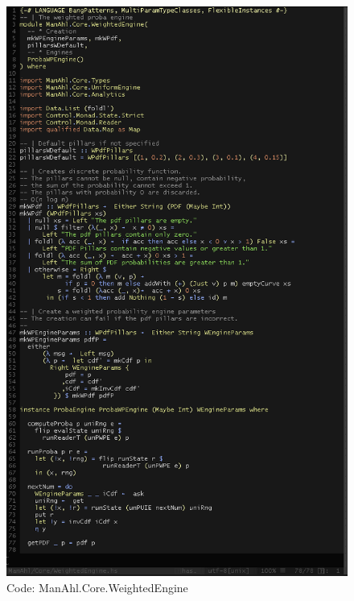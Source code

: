 \documentclass[12pt,a4paper,article]{memoir} %
\begin{document}
\begin{figure}[h!]
\centering
\includegraphics[width=1\textwidth]{img/code-we.png}
\caption{Code: ManAhl.Core.WeightedEngine}
\label{fig:core.we}
\end{figure}
\end{document}

